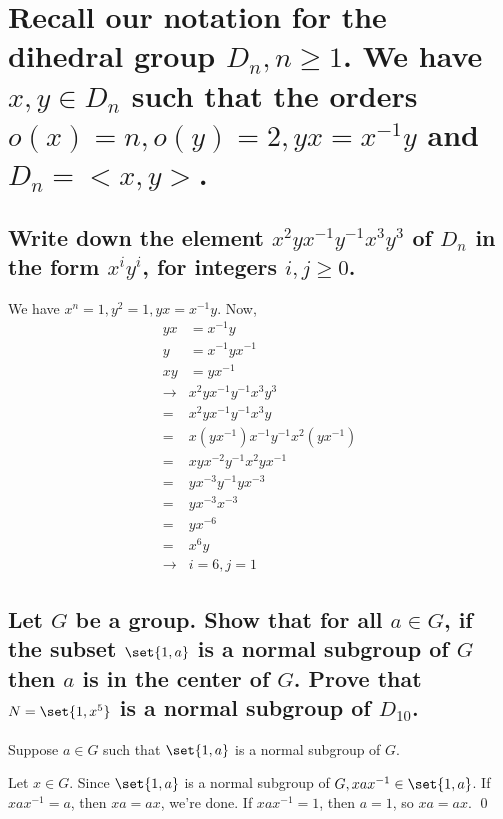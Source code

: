 \section[Problem 5]{Recall our notation for the dihedral group $D_n, n \geq 1$.
    We have $x,y\in D_n$ such that the orders $o(x) = n, o(y)=2, yx = x^{-1}y$ and $D_n = <x,y>$.}
    \subsection[(i)]{Write down the element $x^2yx^{-1}y^{-1}x^3y^3$ of $D_n$
        in the form $x^iy^i$, for integers $i,j \geq 0$.}

        We have $x^n = 1, y^2 = 1, yx = x^{-1}y$.
        Now, 
        \begin{align*}
            yx &= x^{-1}y \\
            y &= x^{-1}y x^{-1} \\
            xy &= y x^{-1} \\
            \to & x^2yx^{-1}y^{-1}x^3y^3 \\
            = & x^2yx^{-1}y^{-1}x^3y \\
            = & x (y x^{-1}) x^{-1}y^{-1}x^2 (y x^{-1}) \\
            = & x y x^{-2}y^{-1}x^2 y x^{-1} \\
            = & y x^{-3}y^{-1} y x^{-3} \\
            = & y x^{-3} x^{-3} \\
            = & y x^{-6} \\
            = & x^6 y \\
            \to & i = 6, j = 1
        \end{align*}


    \subsection[(ii)]{Let $G$ be a group. Show that for all $a\in G$, if the subset $\set{1,a}$
        is a normal subgroup of $G$ then $a$ is in the center of $G$.
        Prove that $N = \set{1, x^5}$ is a normal subgroup of $D_{10}$.}
        
        Suppose $a\in G$ such that $\set{1,a}$ is a normal subgroup of $G$.

        Let $x \in G$.
        Since $\set{1,a}$ is a normal subgroup of $G, xax^{-1} \in \set{1,a}$.
        If $xax^{-1} = a$, then $xa = ax$, we're done.
        If $xax^{-1} = 1$, then $a = 1$, so $xa = ax$.
        \qed

